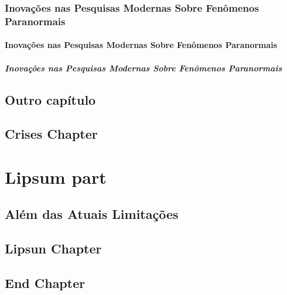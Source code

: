 \section{Inovações nas Pesquisas Modernas Sobre Fenômenos Paranormais }

\lipsum[1-5]


\subsection{Inovações nas Pesquisas Modernas Sobre Fenômenos Paranormais }

\lipsum[1-5]

\subsubsection{Inovações nas Pesquisas Modernas Sobre Fenômenos Paranormais }


\lipsum[1-5]



\chapter{Outro capítulo}

\lipsum[1-5]







\chapter{Crises Chapter}


\lipsum[1-5]





\part{Lipsum part}

\chapter{Além das Atuais Limitações}

\lipsum[1-5]



\chapter{Lipsun Chapter}



\lipsum[1-5]




\chapter{End Chapter }



\lipsum[1-5]
 





